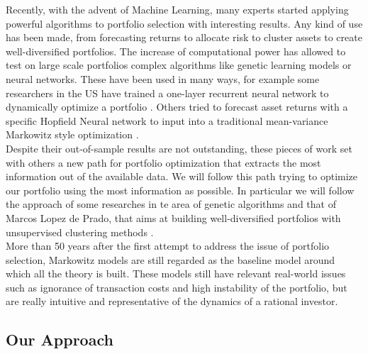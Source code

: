 \documentclass[a4paper]{article}
\numberwithin{equation}{subsection}
\begin{document}
Recently, with the advent of Machine Learning, many experts started applying powerful algorithms to portfolio selection with interesting results. Any kind of use has been made, from forecasting returns to allocate risk to cluster assets to create well-diversified portfolios. The increase of computational power has allowed to test on large scale portfolios complex algorithms like genetic learning models or neural networks. These have been used in many ways, for example some researchers in the US have trained a one-layer recurrent neural network to dynamically optimize a portfolio \cite{NN_1}. Others tried to forecast asset returns with a specific Hopfield Neural network to input into a traditional mean-variance Markowitz style optimization \cite{NN_2}.\\
Despite their out-of-sample results are not outstanding, these pieces of work set with others a new path for portfolio optimization that extracts the most information out of the available data. We will follow this path trying to optimize our portfolio using the most information as possible. In particular we will follow the approach of some researches in te area of genetic algorithms \cite{genetic_1} and that of Marcos Lopez de Prado, that aims at building well-diversified portfolios with unsupervised clustering methods \cite{HRP}.\\
More than 50 years after the first attempt to address the issue of portfolio selection, Markowitz models are still regarded as the baseline model around which all the theory is built. These models still have relevant real-world issues such as ignorance of transaction costs and high instability of the portfolio, but are really intuitive and representative of the dynamics of a rational investor.  


\subsection{Our Approach}
\end{document}
